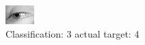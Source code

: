\begin{figure}[h!]
\begin{center}
\includegraphics[width=0.60\columnwidth]{figures/ID3032_class_3_target_4.png}
\end{center}
\caption{ Classification: 3 actual target: 4}
\label{fig:ID3032_class_3_target_4}
\end{figure}
